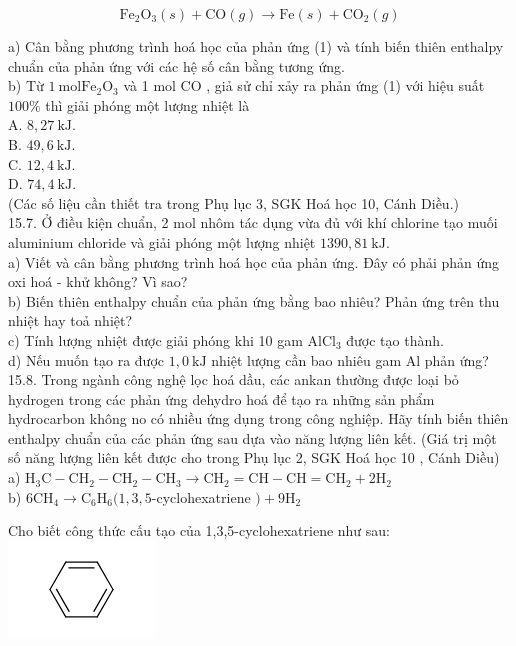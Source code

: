 \documentclass[10pt]{article}
\begin{document}
\begin{equation*}
\mathrm{Fe}_{2} \mathrm{O}_{3}(s)+\mathrm{CO}(g) \rightarrow \mathrm{Fe}(s)+\mathrm{CO}_{2}(g) \tag{1}
\end{equation*}


a) Cân bằng phương trình hoá học của phản ứng (1) và tính biến thiên enthalpy chuẩn của phản ứng với các hệ số cân bằng tương ứng.\\
b) Từ $1 \mathrm{~mol} \mathrm{Fe}_{2} \mathrm{O}_{3}$ và 1 mol CO , giả sử chỉ xảy ra phản ứng (1) với hiệu suất $100 \%$ thì giải phóng một lượng nhiệt là\\
A. $8,27 \mathrm{~kJ}$.\\
B. $49,6 \mathrm{~kJ}$.\\
C. $12,4 \mathrm{~kJ}$.\\
D. $74,4 \mathrm{~kJ}$.\\
(Các số liệu cần thiết tra trong Phụ lục 3, SGK Hoá học 10, Cánh Diều.)\\
15.7. Ở điều kiện chuẩn, 2 mol nhôm tác dụng vừa đủ với khí chlorine tạo muối aluminium chloride và giải phóng một lượng nhiệt $1390,81 \mathrm{~kJ}$.\\
a) Viết và cân bằng phương trình hoá học của phản ứng. Đây có phải phản ứng oxi hoá - khử không? Vì sao?\\
b) Biến thiên enthalpy chuẩn của phản ứng bằng bao nhiêu? Phản ứng trên thu nhiệt hay toả nhiệt?\\
c) Tính lượng nhiệt được giải phóng khi 10 gam $\mathrm{AlCl}_{3}$ được tạo thành.\\
d) Nếu muốn tạo ra được $1,0 \mathrm{~kJ}$ nhiệt lượng cần bao nhiêu gam Al phản ứng?\\
15.8. Trong ngành công nghệ lọc hoá dầu, các ankan thường được loại bỏ hydrogen trong các phản ứng dehydro hoá để tạo ra những sản phẩm hydrocarbon không no có nhiều ứng dụng trong công nghiệp. Hãy tính biến thiên enthalpy chuẩn của các phản ứng sau dựa vào năng lượng liên kết. (Giá trị một số năng lượng liên kết được cho trong Phụ lục 2, SGK Hoá học 10 , Cánh Diều)\\
a) $\mathrm{H}_{3} \mathrm{C}-\mathrm{CH}_{2}-\mathrm{CH}_{2}-\mathrm{CH}_{3} \rightarrow \mathrm{CH}_{2}=\mathrm{CH}-\mathrm{CH}=\mathrm{CH}_{2}+2 \mathrm{H}_{2}$\\
b) $6 \mathrm{CH}_{4} \rightarrow \mathrm{C}_{6} \mathrm{H}_{6}(1,3,5$-cyclohexatriene $)+9 \mathrm{H}_{2}$

Cho biết công thức cấu tạo của 1,3,5-cyclohexatriene như sau:\\
\includegraphics{smile-32fa173088c9c6fbb4d87dcf63069a62635c0f4b}
\end{document}
